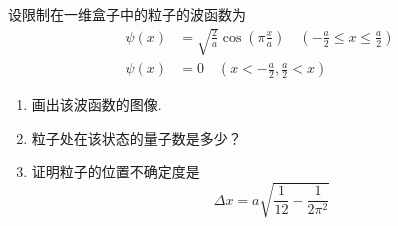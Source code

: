 \begin{exercise}\label{ex:24.4}
设限制在一维盒子中的粒子的波函数为
\begin{align*}
  \psi(x) &= \sqrt{\frac{2}{a}} \cos\left(\pi\frac{x}{a}\right) \quad \left(-\frac{a}{2} \le x \le \frac{a}{2}\right) \\
  \psi(x) &= 0 \quad \left(x < -\frac{a}{2}, \frac{a}{2} < x\right)
\end{align*}
\begin{enumerate}
  \item[(a)] 画出该波函数的图像. 
  \item[(b)] 粒子处在该状态的量子数是多少？
  \item[(c)] 证明粒子的位置不确定度是
  $$ \Delta x = a \sqrt{\frac{1}{12} - \frac{1}{2\pi^2}} $$
\end{enumerate}
\end{exercise}
